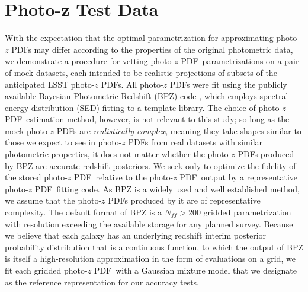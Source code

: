 \documentclass[\docopts]{\docclass}
\newcommand{\pz}{photo-$z$ PDF}
\begin{document}
\section{Photo-z Test Data}
\label{sec:data}

With the expectation that the optimal parametrization for approximating \pz s 
may differ according to the properties of the original photometric data, we 
demonstrate a procedure for vetting \pz\ parametrizations on a pair of mock 
datasets, each intended to be realistic projections of subsets of the 
anticipated LSST \pz s.
All \pz s were fit using the publicly available Bayesian Photometric Redshift 
(BPZ) code \citep{benitez_bayesian_2000}, which employs spectral energy 
distribution (SED) fitting to a template library.
The choice of \pz\ estimation method, however, is not relevant to this study; 
so long as the mock \pz s are \textit{realistically complex}, meaning they take 
shapes similar to those we expect to see in \pz s from real datasets with 
similar photometric properties, it does not matter whether the \pz s produced 
by BPZ are accurate redshift posteriors.
We seek only to optimize the fidelity of the stored \pz\ relative to the \pz\ 
output by a representative \pz\ fitting code.
\citep[See][Schmidt, et al.\ in preparation, and Amaro, et al.\ in preparation 
for other work comparing the accuracy of \pz s produced by different 
methods.]{tanaka_photometric_2017, jong_third_2017}
As BPZ is a widely used and well established method, we assume that the \pz s 
produced by it are of representative complexity.
The default format of BPZ is a $N_{ff}>200$ gridded parametrization with 
resolution exceeding the available storage for any planned survey.
Because we believe that each galaxy has an underlying redshift interim 
posterior probability distribution that is a continuous function, to which the 
output of BPZ is itself a high-resolution approximation in the form of 
evaluations on a grid, we fit each gridded \pz\ with a Gaussian mixture model 
that we designate as the reference representation for our accuracy tests.
\end{document}
